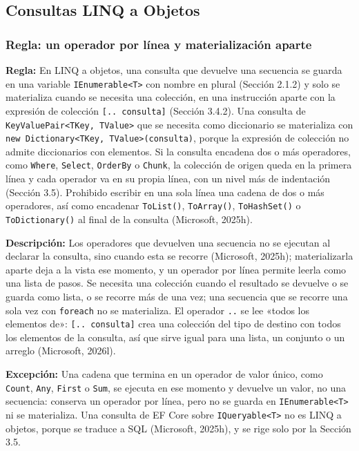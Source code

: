 \subsection{Consultas LINQ a Objetos}

\subsubsection{Regla: un operador por línea y materialización aparte}

\textbf{Regla:} En LINQ a objetos, una consulta que devuelve una secuencia se guarda en una variable \texttt{IEnumerable<T>} con nombre en plural (Sección 2.1.2) y solo se materializa cuando se necesita una colección, en una instrucción aparte con la expresión de colección \texttt{[.. consulta]} (Sección 3.4.2). Una consulta de \texttt{KeyValuePair<TKey, TValue>} que se necesita como diccionario se materializa con \texttt{new Dictionary<TKey, TValue>(consulta)}, porque la expresión de colección no admite diccionarios con elementos. Si la consulta encadena dos o más operadores, como \texttt{Where}, \texttt{Select}, \texttt{OrderBy} o \texttt{Chunk}, la colección de origen queda en la primera línea y cada operador va en su propia línea, con un nivel más de indentación (Sección 3.5). Prohibido escribir en una sola línea una cadena de dos o más operadores, así como encadenar \texttt{ToList()}, \texttt{ToArray()}, \texttt{ToHashSet()} o \texttt{ToDictionary()} al final de la consulta (Microsoft, 2025h).

\textbf{Descripción:} Los operadores que devuelven una secuencia no se ejecutan al declarar la consulta, sino cuando esta se recorre (Microsoft, 2025h); materializarla aparte deja a la vista ese momento, y un operador por línea permite leerla como una lista de pasos. Se necesita una colección cuando el resultado se devuelve o se guarda como lista, o se recorre más de una vez; una secuencia que se recorre una sola vez con \texttt{foreach} no se materializa. El operador \texttt{..} se lee «todos los elementos de»: \texttt{[.. consulta]} crea una colección del tipo de destino con todos los elementos de la consulta, así que sirve igual para una lista, un conjunto o un arreglo (Microsoft, 2026l).

\textbf{Excepción:} Una cadena que termina en un operador de valor único, como \texttt{Count}, \texttt{Any}, \texttt{First} o \texttt{Sum}, se ejecuta en ese momento y devuelve un valor, no una secuencia: conserva un operador por línea, pero no se guarda en \texttt{IEnumerable<T>} ni se materializa. Una consulta de EF Core sobre \texttt{IQueryable<T>} no es LINQ a objetos, porque se traduce a SQL (Microsoft, 2025h), y se rige solo por la Sección 3.5.

